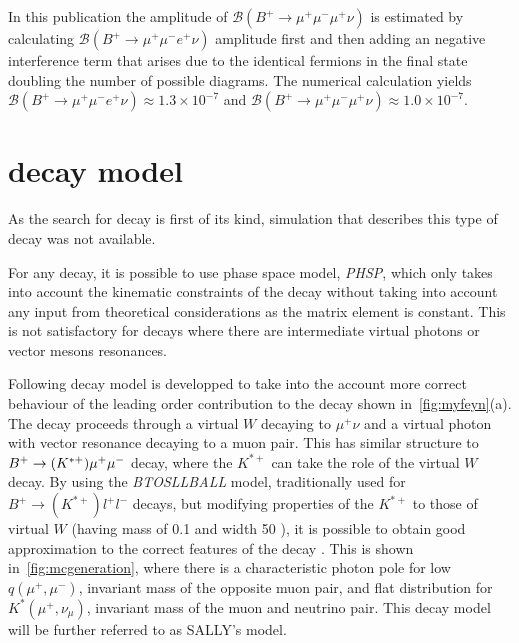 In this publication the amplitude of $\mathcal{B}(B^{+}\rightarrow \mu^{+} \mu^{-} \mu^{+} \nu)$ is estimated by calculating $\mathcal{B}(B^{+}\rightarrow \mu^{+} \mu^{-} e^{+} \nu)$ amplitude first and then adding an negative interference term that arises due to the identical fermions in the final state doubling the number of possible diagrams. The numerical calculation yields $\mathcal{B}(B^{+}\rightarrow \mu^{+} \mu^{-} e^{+} \nu) \approx 1.3 \times 10^{-7}$ and $\mathcal{B}(B^{+}\rightarrow \mu^{+} \mu^{-} \mu^{+} \nu) \approx 1.0 \times 10^{-7}$. 

\section{\Bmumumu decay model}
As the search for \Bmumumu decay is first of its kind, simulation that describes this type of decay was not available. 

For any decay, it is possible to use phase space model, \textit{PHSP}, which only takes into account the kinematic constraints of the decay without taking into account any input from theoretical considerations as the matrix element is constant. This is not satisfactory for decays where there are intermediate virtual photons or vector mesons resonances.

Following decay model is developped to take into the account more correct behaviour of the leading order contribution to the decay shown in~\autoref{fig:myfeyn}(a). The decay proceeds through a virtual $W$ decaying to $\mu^{+} \nu$ and a virtual photon with vector resonance decaying to a muon pair. This has similar structure to ${B}^{+} \rightarrow (K^{*+}) \mu^{+} \mu^{-}$ decay, where the $K^{*+}$ can take the role of the virtual $W$ decay. By using the \textit{BTOSLLBALL} model\cite{Ali:1999mm}, traditionally used for $B^{+} \rightarrow (K^{*+}) l^{+} l^{-}$ decays, but modifying properties of the $K^{*+}$ to those of virtual $W$ (having mass of 0.1 \gevcc and width 50 \gev), it is possible to obtain good approximation to the correct features of the decay . This is shown in~\autoref{fig:mcgeneration}, where there is a characteristic photon pole for low $q(\mu^{+},\mu^{-})$, invariant mass of the opposite muon pair, and flat distribution for $K^{*}(\mu^{+}, \nu_{\mu}) $, invariant mass of the muon and neutrino pair. This decay model will be further referred to as SALLY's model. 


